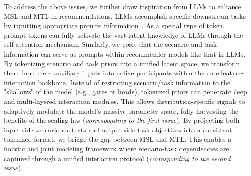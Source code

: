 To address the above issues, we further draw inspiration from LLMs to enhance MSL and MTL in recommendations.
LLMs accomplish specific downstream tasks by inputting appropriate prompt information~\cite{gpt4,qwen3}.
As a special type of token, prompt tokens can fully activate the vast latent knowledge of LLMs through the self-attention mechanism.
Similarly, we posit that the scenario and task information can serve as prompts within recommender models like that in LLMs.
By tokenizing scenario and task priors into a unified latent space, we transform them from mere auxiliary inputs into active participants within the core feature-interaction backbone.
Instead of restricting scenario/task information to the "shallows" of the model (e.g., gates or heads), tokenized priors can penetrate deep and multi-layered interaction modules. This allows distribution-specific signals to adaptively modulate the model's massive parameter space, fully harvesting the benefits of the scaling law (\emph{corresponding to the first issue}).
By projecting both input-side scenario contexts and output-side task objectives into a consistent tokenized format, we bridge the gap between MSL and MTL. This enables a holistic and joint modeling framework where scenario-task dependencies are captured through a unified interaction protocol (\emph{corresponding to the second issue}).

